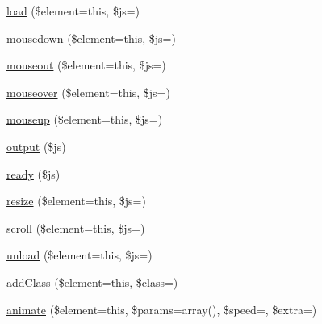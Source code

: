 \begin{DoxyCompactItemize}
\item 
\mbox{\hyperlink{class_c_i___javascript_a5e0d3ce786a91561730aa9610b811f67}{load}} (\$element=\textquotesingle{}this\textquotesingle{}, \$js=\textquotesingle{}\textquotesingle{})
\item 
\mbox{\hyperlink{class_c_i___javascript_afa625106ad51c2f80ccfadf94981041d}{mousedown}} (\$element=\textquotesingle{}this\textquotesingle{}, \$js=\textquotesingle{}\textquotesingle{})
\item 
\mbox{\hyperlink{class_c_i___javascript_ab2d069b9fbd0500e0f514e9ec5dc94e1}{mouseout}} (\$element=\textquotesingle{}this\textquotesingle{}, \$js=\textquotesingle{}\textquotesingle{})
\item 
\mbox{\hyperlink{class_c_i___javascript_af54e0f954a0bb3983011578c848faf48}{mouseover}} (\$element=\textquotesingle{}this\textquotesingle{}, \$js=\textquotesingle{}\textquotesingle{})
\item 
\mbox{\hyperlink{class_c_i___javascript_a31b2b5c28657895274f5658517a2342a}{mouseup}} (\$element=\textquotesingle{}this\textquotesingle{}, \$js=\textquotesingle{}\textquotesingle{})
\item 
\mbox{\hyperlink{class_c_i___javascript_a95bc25e9063b14d257e97e4b205073ba}{output}} (\$js)
\item 
\mbox{\hyperlink{class_c_i___javascript_a00997e6137ed7dc0de0159ed143a107b}{ready}} (\$js)
\item 
\mbox{\hyperlink{class_c_i___javascript_a972b62f88e96fb29b179469e0d49329a}{resize}} (\$element=\textquotesingle{}this\textquotesingle{}, \$js=\textquotesingle{}\textquotesingle{})
\item 
\mbox{\hyperlink{class_c_i___javascript_acb749f777082c90c2b46eb1c367522dc}{scroll}} (\$element=\textquotesingle{}this\textquotesingle{}, \$js=\textquotesingle{}\textquotesingle{})
\item 
\mbox{\hyperlink{class_c_i___javascript_abe5e3762033021416ab5c4d0dce993bf}{unload}} (\$element=\textquotesingle{}this\textquotesingle{}, \$js=\textquotesingle{}\textquotesingle{})
\item 
\mbox{\hyperlink{class_c_i___javascript_ab624b7e1064cc514288eedc7ed5f121f}{add\+Class}} (\$element=\textquotesingle{}this\textquotesingle{}, \$class=\textquotesingle{}\textquotesingle{})
\item 
\mbox{\hyperlink{class_c_i___javascript_a04c5fa4911b166171608bc2651b1b2df}{animate}} (\$element=\textquotesingle{}this\textquotesingle{}, \$params=array(), \$speed=\textquotesingle{}\textquotesingle{}, \$extra=\textquotesingle{}\textquotesingle{})

\end{DoxyCompactItemize}

